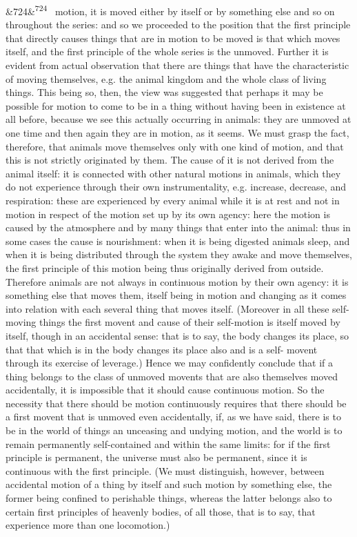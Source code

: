\documentclass[12pt]{article}
\newcommand{\para}[1][]{\par\noindent\ifx&#1&\else\textsuperscript{\footnotesize #1}~\fi}
\begin{document}
\para[724] motion, it is moved either by itself or by something else and so on throughout the series: and so we proceeded to the position that the first principle that directly causes things that are in motion to be moved is that which moves itself, and the first principle of the whole series is the unmoved. Further it is evident from actual observation that there are things that have the characteristic of moving themselves, e.g. the animal kingdom and the whole class of living things. This being so, then, the view was suggested that perhaps it may be possible for motion to come to be in a thing without having been in existence at all before, because we see this actually occurring in animals: they are unmoved at one time and then again they are in motion, as it seems. We must grasp the fact, therefore, that animals move themselves only with one kind of motion, and that this is not strictly originated by them. The cause of it is not derived from the animal itself: it is connected with other natural motions in animals, which they do not experience through their own instrumentality, e.g. increase, decrease, and respiration: these are experienced by every animal while it is at rest and not in motion in respect of the motion set up by its own agency: here the motion is caused by the atmosphere and by many things that enter into the animal: thus in some cases the cause is nourishment: when it is being digested animals sleep, and when it is being distributed through the system they awake and move themselves, the first principle of this motion being thus originally derived from outside. Therefore animals are not always in continuous motion by their own agency: it is something else that moves them, itself being in motion and changing as it comes into relation with each several thing that moves itself. (Moreover in all these self-moving things the first movent and cause of their self-motion is itself moved by itself, though in an accidental sense: that is to say, the body changes its place, so that that which is in the body changes its place also and is a self- movent through its exercise of leverage.) Hence we may confidently conclude that if a thing belongs to the class of unmoved movents that are also themselves moved accidentally, it is impossible that it should cause continuous motion. So the necessity that there should be motion continuously requires that there should be a first movent that is unmoved even accidentally, if, as we have said, there is to be in the world of things an unceasing and undying motion, and the world is to remain permanently self-contained and within the same limits: for if the first principle is permanent, the universe must also be permanent, since it is continuous with the first principle. (We must distinguish, however, between accidental motion of a thing by itself and such motion by something else, the former being confined to perishable things, whereas the latter belongs also to certain first principles of heavenly bodies, of all those, that is to say, that experience more than one locomotion.)
\end{document}
